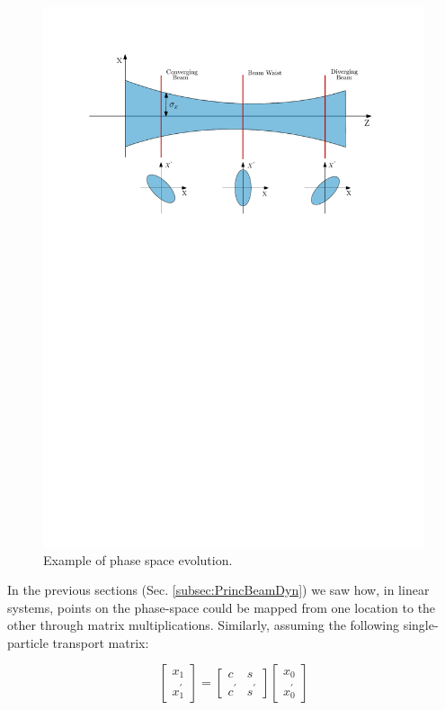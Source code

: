 \begin{figure}[h]
    \centering
    \includegraphics[width=0.9\columnwidth]{Figure_BeamEvolution/BeamEvolution.pdf}
    \caption{Example of phase space evolution. }
    \label{fig:PhasSpaceEvol}
\end{figure}

In the previous sections (Sec. \ref{subsec:PrincBeamDyn}) we saw how, in linear systems, points on the phase-space could be mapped from one location to the other through matrix multiplications. Similarly, assuming the following single-particle transport matrix:

\begin{equation}
    \begin{bmatrix}
         x_1 \\ x_1^{'} 
    \end{bmatrix}
    = 
    \begin{bmatrix}
       c & s \\ c^{'} & s^{'}
     \end{bmatrix}
     \begin{bmatrix}
        x_0 \\ x_0^{'}
     \end{bmatrix}
\end{equation}

